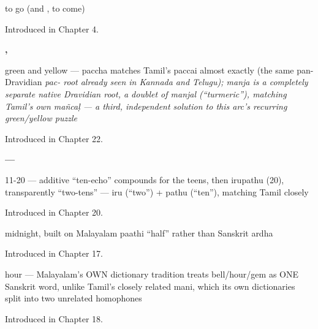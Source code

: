 \noindent\begin{minipage}[t]{\linewidth}
\raggedright
\textbf{}\par
\small to go (and , to come)\par
\footnotesize Introduced in Chapter 4.
\end{minipage}\par\medskip

\noindent\begin{minipage}[t]{\linewidth}
\raggedright
\textbf{, }\par
\small green and yellow — paccha matches Tamil's paccai almost exactly (the same pan-Dravidian \emph{pac- root already seen in Kannada and Telugu); manja is a completely separate native Dravidian root, a doublet of manjal (\textquotedblleft{}turmeric\textquotedblright{}), matching Tamil's own mañcaḷ — a third, independent solution to this arc's recurring green/yellow puzzle}\par
\footnotesize Introduced in Chapter 22.
\end{minipage}\par\medskip

\noindent\begin{minipage}[t]{\linewidth}
\raggedright
\textbf{ — }\par
\small 11-20 — additive \textquotedblleft{}ten-echo\textquotedblright{} compounds for the teens, then irupathu (20), transparently \textquotedblleft{}two-tens\textquotedblright{} — iru (\textquotedblleft{}two\textquotedblright{}) + pathu (\textquotedblleft{}ten\textquotedblright{}), matching Tamil closely\par
\footnotesize Introduced in Chapter 20.
\end{minipage}\par\medskip

\noindent\begin{minipage}[t]{\linewidth}
\raggedright
\textbf{}\par
\small midnight, built on Malayalam paathi \textquotedblleft{}half\textquotedblright{} rather than Sanskrit ardha\par
\footnotesize Introduced in Chapter 17.
\end{minipage}\par\medskip

\noindent\begin{minipage}[t]{\linewidth}
\raggedright
\textbf{}\par
\small hour — Malayalam's OWN dictionary tradition treats bell/hour/gem as ONE Sanskrit word, unlike Tamil's closely related mani, which its own dictionaries split into two unrelated homophones\par
\footnotesize Introduced in Chapter 18.
\end{minipage}\par\medskip

